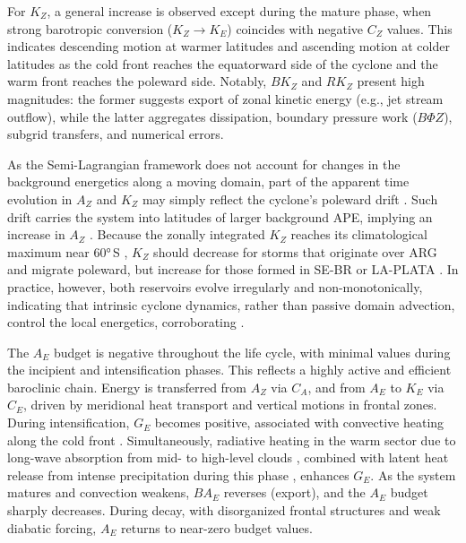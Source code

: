 \documentclass[pdflatex,sn-chicago]{sn-jnl}%
\theoremstyle{plain}
\theoremstyle{definition}
\theoremstyle{remark}
\theoremstyle{definition}
\begin{document}
For $K_Z$, a general increase is observed except during the mature phase, when strong barotropic conversion ($K_Z \rightarrow K_E$) coincides with negative $C_Z$ values. This indicates descending motion at warmer latitudes and ascending motion at colder latitudes as the cold front reaches the equatorward side of the cyclone and the warm front reaches the poleward side. Notably, $BK_Z$ and $RK_Z$ present high magnitudes: the former suggests export of zonal kinetic energy (e.g., jet stream outflow), while the latter aggregates dissipation, boundary pressure work ($B\Phi Z$), subgrid transfers, and numerical errors. 

As the Semi-Lagrangian framework does not account for changes in the background energetics along a moving domain, part of the apparent time evolution in \(A_Z\) and \(K_Z\) may simply reflect the cyclone’s poleward drift \citep{couto2024new}. Such drift carries the system into latitudes of larger background APE, implying an increase in \(A_Z\) \citep{novak2018local, liu2024systematic}. Because the zonally integrated \(K_Z\) reaches its climatological maximum near 60°\,S \citep{novak2018local, liu2024systematic}, \(K_Z\) should decrease for storms that originate over ARG and migrate poleward, but increase for those formed in SE-BR or LA-PLATA . In practice, however, both reservoirs evolve irregularly and non-monotonically, indicating that intrinsic cyclone dynamics, rather than passive domain advection, control the local energetics, corroborating \citet{federer2025synoptic}.

The $A_E$ budget is negative throughout the life cycle, with minimal values during the incipient and intensification phases. This reflects a highly active and efficient baroclinic chain. Energy is transferred from $A_Z$ via $C_A$, and from $A_E$ to $K_E$ via $C_E$, driven by meridional heat transport and vertical motions in frontal zones. During intensification, $G_E$ becomes positive, associated with convective heating along the cold front \citep[e.g.,][]{govekar2011three}. Simultaneously, radiative heating in the warm sector due to long-wave absorption from mid- to high-level clouds \citep{lau1997comparing,keshtgar2023cloud}, combined with latent heat release from intense precipitation during this phase \citep{mcerlich2023assessment}, enhances $G_E$. As the system matures and convection weakens, $BA_E$ reverses (export), and the $A_E$ budget sharply decreases. During decay, with disorganized frontal structures and weak diabatic forcing, $A_E$ returns to near-zero budget values.
\end{document}
